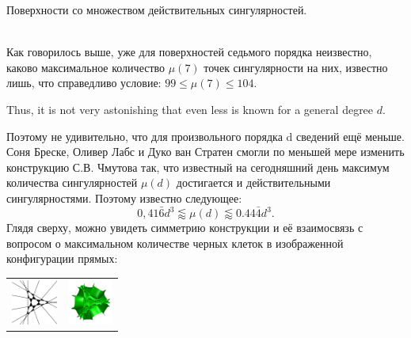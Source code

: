 \documentclass[ru]{./../../common/SurferDesc}%
\begin{document}
\footnotesize




\begin{surferPage}
  \begin{surferTitle}Поверхности со множеством действительных сингулярностей.\end{surferTitle}   \\
    Как говорилось выше, уже для поверхностей седьмого порядка неизвестно, каково максимальное количество $\mu(7)$ точек сингулярности на них, известно лишь, что справедливо условие: $99\le \mu(7) \le 104$. 


    Thus, it is not very astonishing that even less is known for a general degree $d$. 

Поэтому не удивительно, что для произвольного порядка d сведений ещё меньше. Соня Бреске, Оливер Лабс и Дуко ван Стратен смогли по меньшей мере изменить конструкцию С.В. Чмутова так, что известный на сегодняшний день максимум количества сингулярностей $\mu(d)$ достигается и действительными сингулярностями. Поэтому известно следующее: 
    \[0,41\bar{6}d^3 \lessapprox \mu(d) \lessapprox 0.44\bar{4} d^3.\]
Глядя сверху, можно увидеть симметрию конструкции и её взаимосвязь с вопросом о максимальном количестве черных клеток в изображенной конфигурации прямых:
    \begin{center}
      \begin{tabular}{c@{\qquad}c}
        \includegraphics[height=1.5cm]{./../../common/images/vielesing.pdf}
        &
        \includegraphics[height=1.5cm]{./../../common/images/p9surface_von_oben}
      \end{tabular}
    \end{center}

  \begin{surferText}
     \end{surferText}
\end{surferPage}
\end{document}
